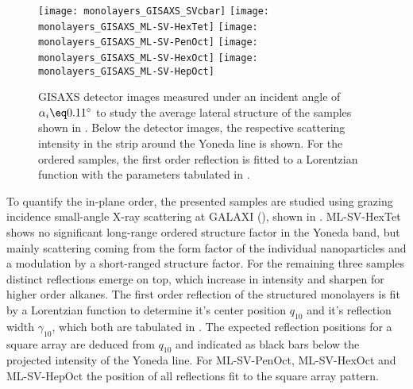 \documentclass[\main/dresen_thesis.tex]{subfiles}
\begin{document}
    \begin{figure}[tb]
      \centering
      \texttt{[image: monolayers\_GISAXS\_SVcbar]}
      \texttt{[image: monolayers\_GISAXS\_ML-SV-HexTet]}
      \texttt{[image: monolayers\_GISAXS\_ML-SV-PenOct]}
      \texttt{[image: monolayers\_GISAXS\_ML-SV-HexOct]}
      \texttt{[image: monolayers\_GISAXS\_ML-SV-HepOct]}
      \caption{\label{fig:monolayers:preparation:solventVariation:gisaxs}GISAXS detector images measured under an incident angle of $\alpha_i \eq 0.11 ^\circ$ to study the average lateral structure of the samples shown in . Below the detector images, the respective scattering intensity in the strip around the Yoneda line is shown. For the ordered samples, the first order reflection is fitted to a Lorentzian function with the parameters tabulated in .}
    \end{figure}

    To quantify the in-plane order, the presented samples are studied using grazing incidence small-angle X-ray scattering at GALAXI (), shown in .
    ML-SV-HexTet shows no significant long-range ordered structure factor in the Yoneda band, but mainly scattering coming from the form factor of the individual nanoparticles and a modulation by a short-ranged structure factor.
    For the remaining three samples distinct reflections emerge on top, which increase in intensity and sharpen for higher order alkanes.
    The first order reflection of the structured monolayers is fit by a Lorentzian function to determine it's center position  $q_{10}$ and it's reflection width $\gamma_{10}$, which both are tabulated in .
    The expected reflection positions for a square array are deduced from $q_{10}$ and indicated as black bars below the projected intensity of the Yoneda line.
    For ML-SV-PenOct, ML-SV-HexOct and ML-SV-HepOct the position of all reflections fit to the square array pattern.
\end{document}
